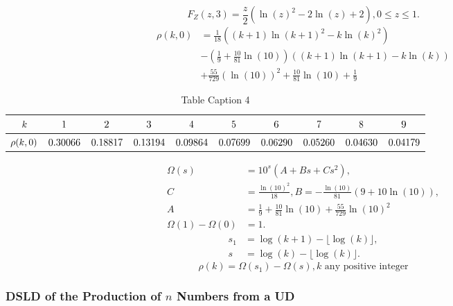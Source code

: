 \documentclass[titlepage,fleqn]{article}%
\begin{document}
\[
F_{Z}(z,3)=\frac{z}{2}\left(  \ln(z)^{2}-2\ln(z)+2\right)  ,0\leq z\leq1.
\]%
\begin{align*}
\rho(k,0)  &  =\frac{1}{18}\left(  (k+1)\ln(k+1)^{2}-k\ln(k)^{2}\right) \\
&  -\left(  \frac{1}{9}+\frac{10}{81}\ln(10)\right)  \left(  (k+1)\ln
(k+1)-k\ln(k)\right) \\
&  +\frac{55}{729}\left(  \ln(10)\right)  ^{2}+\frac{10}{81}\ln(10)+\frac
{1}{9}%
\end{align*}
%

\begin{table}[!htbp] \centering
\begin{tabular}
[c]{|c|c|c|c|c|c|c|c|c|c|}\hline\hline
${\small k}$ & ${\small 1}$ & ${\small 2}$ & ${\small 3}$ & ${\small 4}$ &
${\small 5}$ & ${\small 6}$ & ${\small 7}$ & ${\small 8}$ & ${\small 9}%
$\\\hline
${\small \rho(k,0)}$ & ${\small 0.30066}$ & ${\small 0.18817}$ &
${\small 0.13194}$ & ${\small 0.09864}$ & ${\small 0.07699}$ &
${\small 0.06290}$ & ${\small 0.05260}$ & ${\small 0.04630}$ &
${\small 0.04179}$\\\hline\hline
\end{tabular}
\caption{Table Caption 4}\label{TableKey4}%
\end{table}%
%

\begin{align*}
\Omega(s)  &  =10^{s}\left(  A+Bs+Cs^{2}\right)  ,\\
C  &  =\frac{\ln(10)^{2}}{18},B=-\frac{\ln(10)}{81}(9+10\ln(10)),\\
A  &  =\frac{1}{9}+\frac{10}{81}\ln(10)+\frac{55}{729}\ln(10)^{2}\\
\Omega(1)-\Omega(0)  &  =1.
\end{align*}%
\begin{align*}
s_{1}  &  =\log(k+1)-\lfloor\log(k)\rfloor,\\
s  &  =\log(k)-\lfloor\log(k)\rfloor.
\end{align*}%
\[
\rho(k)=\Omega(s_{1})-\Omega(s),k\text{ \ any positive integer}%
\]


\subsubsection{DSLD of the Production of $n$ Numbers from a UD}%
\end{document}
